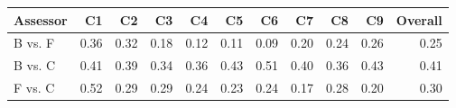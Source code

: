 \begin{table}[]
    \footnotesize
    \centering

\begin{tabular}{lrrrrrrrrrr}
\toprule
                            Assessor &   C1 &   C2 &   C3 &    C4 &   C5 &   C6 &   C7 &   C8 &   C9 &  Overall \\
\midrule
                             B vs. F & 0.36 & 0.32 & 0.18 &  0.12 & 0.11 & 0.09 & 0.20 & 0.24 & 0.26 &     0.25 \\
                             B vs. C & 0.41 & 0.39 & 0.34 &  0.36 & 0.43 & 0.51 & 0.40 & 0.36 & 0.43 &     0.41 \\
                             F vs. C & 0.52 & 0.29 & 0.29 &  0.24 & 0.23 & 0.24 & 0.17 & 0.28 & 0.20 &     0.30 \\ \midrule
                             

\end{tabular}
\end{table}
